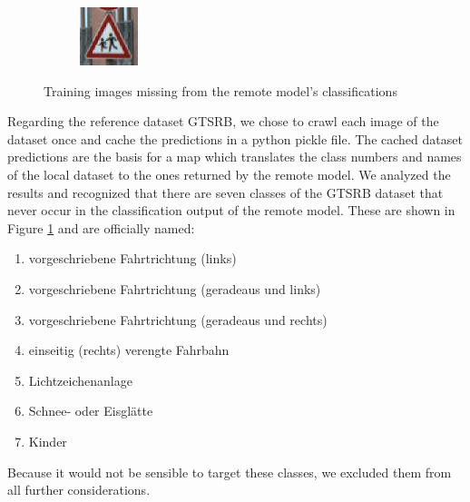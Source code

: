 \begin{figure}
\begin{subfigure}{.19\linewidth}
\end{subfigure}
\begin{subfigure}{.19\linewidth}
\includegraphics[width=0.7\linewidth]{imgs/missing/00014_00027}
\end{subfigure}
\caption{Training images missing from the remote model's classifications}
\label{fig:missing}
\end{figure}

Regarding the reference dataset GTSRB, we chose to crawl each image of the dataset once and cache the predictions in a python pickle file.
The cached dataset predictions are the basis for a map which translates the class numbers and names of the local dataset to the ones returned by the remote model.
We analyzed the results and recognized that there are seven classes of the GTSRB dataset that never occur in the classification output of the remote model. These are shown in Figure \ref{fig:missing} and are officially named:

\begin{enumerate}
	\item vorgeschriebene Fahrtrichtung (links)
	\item vorgeschriebene Fahrtrichtung (geradeaus und links)
	\item vorgeschriebene Fahrtrichtung (geradeaus und rechts)
	\item einseitig (rechts) verengte Fahrbahn
	\item Lichtzeichenanlage
	\item Schnee- oder Eisglätte
	\item Kinder
\end{enumerate}

Because it would not be sensible to target these classes, we excluded them from all further considerations.

